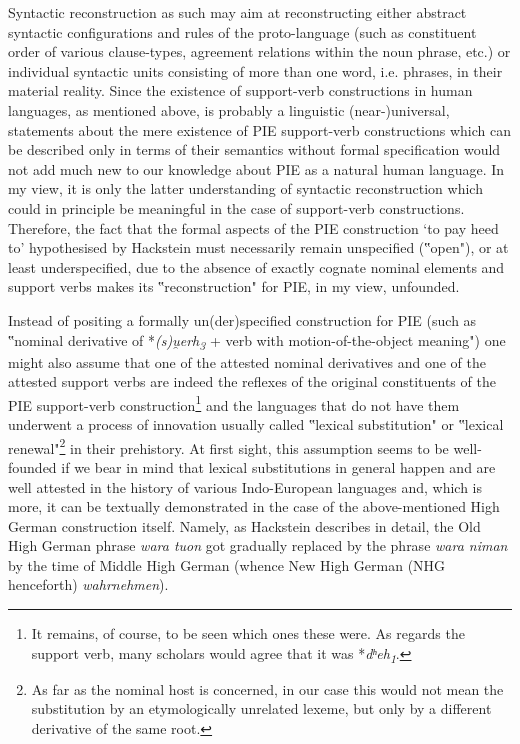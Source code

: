 \documentclass[output=paper,colorlinks,citecolor=brown]{langscibook}
\begin{document}
Syntactic reconstruction as such may aim at reconstructing either abstract syntactic configurations and rules of the proto-language (such as constituent order of various clause-types, agreement relations within the noun phrase, etc.) or individual syntactic units consisting of more than one word, i.e. phrases, in their material reality. Since the existence of support-verb constructions in human languages, as mentioned above, is probably a linguistic (near-)universal, statements about the mere existence of PIE support-verb constructions which can be described only in terms of their semantics without formal specification would not add much new to our knowledge about PIE as a natural human language. In my view, it is only the latter understanding of syntactic reconstruction which could in principle be meaningful in the case of support-verb constructions. Therefore, the fact that the formal aspects of the PIE construction ‘to pay heed to’ hypothesised by Hackstein must necessarily remain unspecified (‟open"), or at least underspecified, due to the absence of exactly cognate nominal elements and support verbs makes its ‟reconstruction" for PIE, in my view, unfounded.

Instead of positing a formally un(der)specified construction for PIE (such as ‟nominal derivative of *\textit{(s)u̯erh\textsubscript{3}} + verb with motion-of-the-object meaning") one might also assume that one of the attested nominal derivatives and one of the attested support verbs are indeed the reflexes of the original constituents of the PIE support-verb construction\footnote{It remains, of course, to be seen which ones these were. As regards the support verb, many scholars would agree that it was *\textit{dʰeh\textsubscript{1}}.}  and the languages that do not have them underwent a process of innovation usually called ‟lexical substitution" or ‟lexical renewal"\footnote{As far as the nominal host is concerned, in our case this would not mean the substitution by an etymologically unrelated lexeme, but only by a different derivative of the same root.} in their prehistory. At first sight, this assumption seems to be well-founded if we bear in mind that lexical substitutions in general  happen and are well attested in the history of various Indo-European languages and, which is more, it can be textually demonstrated in the case of the above-mentioned High German construction itself. Namely, as Hackstein describes in detail, the Old High German phrase \textit{wara tuon} got gradually replaced by the phrase \textit{wara niman} by the time of Middle High German (whence New High German (NHG henceforth) \textit{wahrnehmen}).
\end{document}
